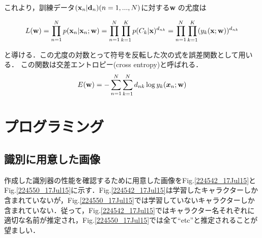 \documentclass[a4paper,10pt]{jsarticle}
\def\vec#1{\mbox{\boldmath$#1$}}
\begin{document}
これより，訓練データ${({\bf x}_n|{\bf d}_n)}(n=1,...,N)$に対する{\bf w}
の尤度は

\begin{equation}
 L({\bf w})=\prod_{n=1}^{N}p({\bf x}_n|{\bf x}_n;{\bf
	w})=\prod_{n=1}^{N}\prod_{k=1}^{K}p(C_k|{\bf
	x})^{d_{nk}}=\prod_{n=1}^{N}\prod_{k=1}^{K}(y_k({\bf x};{\bf w}))^{d_{nk}}
\end{equation}

と導ける．この尤度の対数とって符号を反転した次の式を誤差関数として用いる．
この関数は交差エントロピー(cross entropy)と呼ばれる．
\begin{eqnarray}
 E({\bf w})=-\sum^{N}_{n=1}\sum^{N}_{k=1}d_{nk}\log
	y_{k}(\vec{x}_{n};{\bf w})
\end{eqnarray}


\section{プログラミング}

\subsection{識別に用意した画像}
作成した識別器の性能を確認するために用意した画像をFig.\ref{224542_17Jul15}とFig.\ref{224550_17Jul15}に示す．Fig.\ref{224542_17Jul15}は学習したキャラクターしか含まれていないが，Fig.\ref{224550_17Jul15}では学習していないキャラクターしか含まれていない．従って，Fig.\ref{224542_17Jul15}ではキャラクター名それぞれに適切な名前が推定され，Fig.\ref{224550_17Jul15}では全て``etc''と推定されることが望ましい．
\end{document}
